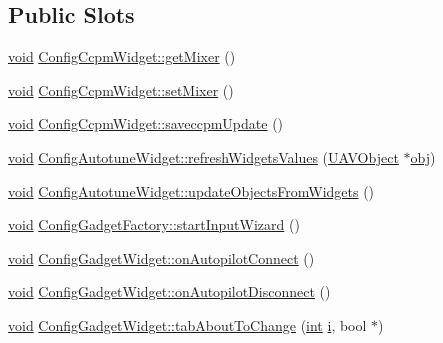 \subsection*{Public Slots}
\begin{DoxyCompactItemize}
\item 
\hyperlink{group___u_a_v_objects_plugin_ga444cf2ff3f0ecbe028adce838d373f5c}{void} \hyperlink{group___config_plugin_ga655f5771884dcc4da79423c9f233ccca}{Config\-Ccpm\-Widget\-::get\-Mixer} ()
\item 
\hyperlink{group___u_a_v_objects_plugin_ga444cf2ff3f0ecbe028adce838d373f5c}{void} \hyperlink{group___config_plugin_gabc1d25c95203b38337f954ed47387039}{Config\-Ccpm\-Widget\-::set\-Mixer} ()
\item 
\hyperlink{group___u_a_v_objects_plugin_ga444cf2ff3f0ecbe028adce838d373f5c}{void} \hyperlink{group___config_plugin_ga58b70d2303d5485482abdd35f2f49c15}{Config\-Ccpm\-Widget\-::saveccpm\-Update} ()
\item 
\hyperlink{group___u_a_v_objects_plugin_ga444cf2ff3f0ecbe028adce838d373f5c}{void} \hyperlink{group___config_plugin_ga7a345485561483fc0d3252acc34f65cd}{Config\-Autotune\-Widget\-::refresh\-Widgets\-Values} (\hyperlink{class_u_a_v_object}{U\-A\-V\-Object} $\ast$\hyperlink{glext_8h_a0c0d4701a6c89f4f7f0640715d27ab26}{obj})
\item 
\hyperlink{group___u_a_v_objects_plugin_ga444cf2ff3f0ecbe028adce838d373f5c}{void} \hyperlink{group___config_plugin_ga20c0a1a9487c7f461a6ea095fac93098}{Config\-Autotune\-Widget\-::update\-Objects\-From\-Widgets} ()
\item 
\hyperlink{group___u_a_v_objects_plugin_ga444cf2ff3f0ecbe028adce838d373f5c}{void} \hyperlink{group___config_plugin_ga12d479e09d53195a2226e61b1690124f}{Config\-Gadget\-Factory\-::start\-Input\-Wizard} ()
\item 
\hyperlink{group___u_a_v_objects_plugin_ga444cf2ff3f0ecbe028adce838d373f5c}{void} \hyperlink{group___config_plugin_ga4f8e913d92b646252bb6d82dfd028c52}{Config\-Gadget\-Widget\-::on\-Autopilot\-Connect} ()
\item 
\hyperlink{group___u_a_v_objects_plugin_ga444cf2ff3f0ecbe028adce838d373f5c}{void} \hyperlink{group___config_plugin_gaa57c964c58914d045daa972b9a1b87ce}{Config\-Gadget\-Widget\-::on\-Autopilot\-Disconnect} ()
\item 
\hyperlink{group___u_a_v_objects_plugin_ga444cf2ff3f0ecbe028adce838d373f5c}{void} \hyperlink{group___config_plugin_ga280d7130ca08f8974292483f6b017d72}{Config\-Gadget\-Widget\-::tab\-About\-To\-Change} (\hyperlink{ioapi_8h_a787fa3cf048117ba7123753c1e74fcd6}{int} \hyperlink{uavobjecttemplate_8m_a6f6ccfcf58b31cb6412107d9d5281426}{i}, bool $\ast$)

\end{DoxyCompactItemize}
